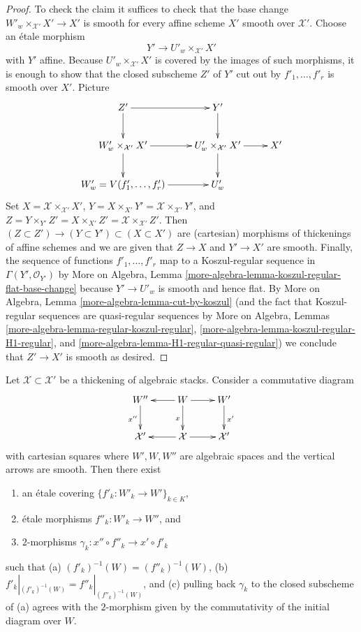 \begin{proof}
\medskip\noindent
To check the claim it suffices to check that the base change
$W'_w \times_{\mathcal{X}'} X' \to X'$ is smooth for every
affine scheme $X'$ smooth over $\mathcal{X}'$. Choose an
\'etale morphism
$$
Y' \to U'_w \times_{\mathcal{X}'} X'
$$
with $Y'$ affine. Because $U'_w \times_{\mathcal{X}'} X'$ is covered
by the images of such morphisms, it is enough to show that the closed
subscheme $Z'$ of $Y'$ cut out by $f'_1, \ldots, f'_r$ is smooth over $X'$.
Picture
$$
\xymatrix{
Z' \ar[r] \ar[d] & Y' \ar[d] \\
W'_w \times_{\mathcal{X}'} X' \ar[d] \ar[r] &
U'_w \times_{\mathcal{X}'} X' \ar[d] \ar[r] & X' \\
W'_w = V(f'_1, \ldots, f'_r) \ar[r] & U'_w
}
$$
Set $X = \mathcal{X} \times_{\mathcal{X}'} X'$,
$Y = X \times_{X'} Y' = \mathcal{X} \times_{\mathcal{X}'} Y'$, and
$Z = Y \times_{Y'} Z' = X \times_{X'} Z' =
\mathcal{X} \times_{\mathcal{X}'} Z'$.
Then $(Z \subset Z') \to (Y \subset Y') \subset (X \subset X')$
are (cartesian) morphisms of thickenings of affine schemes and
we are given that $Z \to X$ and $Y' \to X'$ are smooth.
Finally, the sequence of functions $f'_1, \ldots, f'_r$
map to a Koszul-regular sequence in $\Gamma(Y', \mathcal{O}_{Y'})$ by
More on Algebra, Lemma \ref{more-algebra-lemma-koszul-regular-flat-base-change}
because $Y' \to U'_w$ is smooth and hence flat.
By More on Algebra, Lemma \ref{more-algebra-lemma-cut-by-koszul}
(and the fact that Koszul-regular sequences are quasi-regular sequences
by More on Algebra, Lemmas \ref{more-algebra-lemma-regular-koszul-regular},
\ref{more-algebra-lemma-koszul-regular-H1-regular}, and
\ref{more-algebra-lemma-H1-regular-quasi-regular})
we conclude that $Z' \to X'$ is smooth as desired.
\end{proof}

\begin{lemma}
\label{lemma-etale-local-lifts-isomorphic}
Let $\mathcal{X} \subset \mathcal{X}'$ be a thickening of algebraic stacks.
Consider a commutative diagram
$$
\xymatrix{
W'' \ar[d]_{x''} & W \ar[l] \ar[r] \ar[d]_x & W' \ar[d]^{x'} \\
\mathcal{X}' & \mathcal{X} \ar[l] \ar[r] & \mathcal{X}'
}
$$
with cartesian squares where $W', W, W''$ are algebraic spaces and
the vertical arrows are smooth. Then there exist
\begin{enumerate}
\item an \'etale covering $\{f'_k : W'_k \to W'\}_{k \in K}$,
\item \'etale morphisms $f''_k : W'_k \to W''$, and
\item $2$-morphisms $\gamma_k : x'' \circ f''_k \to x' \circ f'_k$
\end{enumerate}
such that (a) $(f'_k)^{-1}(W) = (f''_k)^{-1}(W)$, (b)
$f'_k|_{(f'_k)^{-1}(W)} = f''_k|_{(f''_k)^{-1}(W)}$, and
(c) pulling back $\gamma_k$ to the closed subscheme of (a)
agrees with the $2$-morphism given by the commutativity of
the initial diagram over $W$.
\end{lemma}

